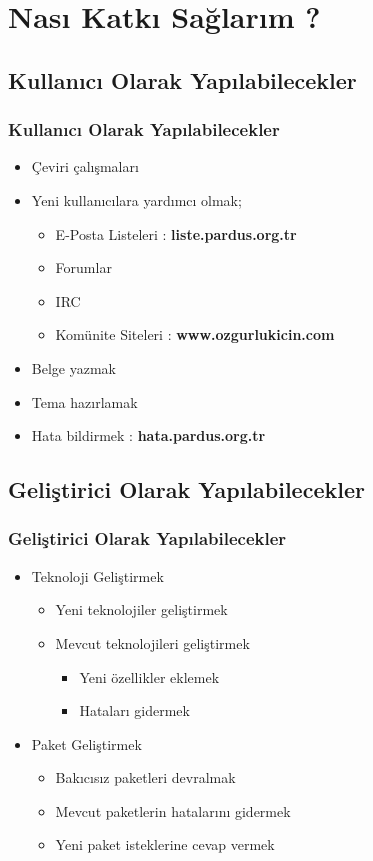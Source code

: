 \documentclass{beamer}
\begin{document}
\section{Nası Katkı Sağlarım ?}

\subsection{Kullanıcı Olarak Yapılabilecekler}
\frame
{
    \frametitle{Kullanıcı Olarak Yapılabilecekler}
	\begin{itemize}
        \item Çeviri çalışmaları
        \item Yeni kullanıcılara yardımcı olmak;
        \begin{itemize}
            \item E-Posta Listeleri : \textbf{liste.pardus.org.tr}
            \item Forumlar
            \item IRC
            \item Komünite Siteleri : \textbf{www.ozgurlukicin.com}
        \end{itemize}
        \item Belge yazmak
        \item Tema hazırlamak
        \item Hata bildirmek : \textbf{hata.pardus.org.tr}
	\end{itemize}
}

\subsection{Geliştirici Olarak Yapılabilecekler}
\frame
{
    \frametitle{Geliştirici Olarak Yapılabilecekler}
	\begin{itemize}
        \item Teknoloji Geliştirmek
        \begin{itemize}
            \item Yeni teknolojiler geliştirmek
            \item Mevcut teknolojileri geliştirmek
            \begin{itemize}
                \item Yeni özellikler eklemek
                \item Hataları gidermek
            \end{itemize}
        \end{itemize}
        \item Paket Geliştirmek
        \begin{itemize}
            \item Bakıcısız paketleri devralmak
            \item Mevcut paketlerin hatalarını gidermek
            \item Yeni paket isteklerine cevap vermek
        \end{itemize}
	\end{itemize}
}
\end{document}
